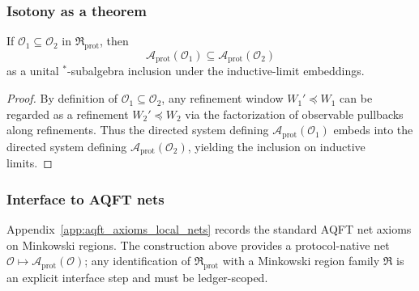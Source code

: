\subsubsection{Isotony as a theorem}
\begin{proposition}
\label{prop:prot_net_isotony}
\MathTag If $\mathcal{O}_1\subseteq\mathcal{O}_2$ in $\mathfrak{R}_{\mathrm{prot}}$, then
\[
\mathcal{A}_{\mathrm{prot}}(\mathcal{O}_1)\subseteq \mathcal{A}_{\mathrm{prot}}(\mathcal{O}_2)
\]
as a unital $^\ast$-subalgebra inclusion under the inductive-limit embeddings.
\end{proposition}
\begin{proof}
By definition of $\mathcal{O}_1\subseteq\mathcal{O}_2$, any refinement window $W_1'\preceq W_1$ can be regarded as a refinement $W_2'\preceq W_2$ via the factorization of observable pullbacks along refinements.
Thus the directed system defining $\mathcal{A}_{\mathrm{prot}}(\mathcal{O}_1)$ embeds into the directed system defining $\mathcal{A}_{\mathrm{prot}}(\mathcal{O}_2)$, yielding the inclusion on inductive limits.
\end{proof}

\subsubsection{Interface to AQFT nets}
\InterfaceTag Appendix~\ref{app:aqft_axioms_local_nets} records the standard AQFT net axioms on Minkowski regions.
The construction above provides a protocol-native net $\mathcal{O}\mapsto\mathcal{A}_{\mathrm{prot}}(\mathcal{O})$; any identification of $\mathfrak{R}_{\mathrm{prot}}$ with a Minkowski region family $\mathfrak{R}$ is an explicit interface step and must be ledger-scoped.

